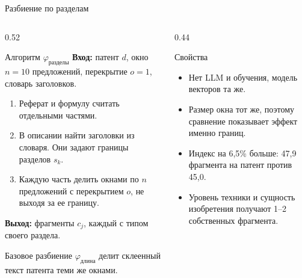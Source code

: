 \documentclass[aspectratio=169]{beamer}
\begin{document}
\begin{frame}{Разбиение по разделам}
    \footnotesize
    \begin{columns}[T]
        \begin{column}{0.52\textwidth}
            \begin{block}{Алгоритм $\varphi_{\text{разделы}}$}
                \textbf{Вход:} патент $d$, окно $n=10$ предложений, перекрытие $o=1$, словарь заголовков.
                \begin{enumerate}[1)]
                    \item Реферат и формулу считать отдельными частями.
                    \item В описании найти заголовки из словаря. Они задают границы разделов $s_k$.
                    \item Каждую часть делить окнами по $n$ предложений с перекрытием $o$, не выходя за ее границу.
                \end{enumerate}
                \textbf{Выход:} фрагменты $c_j$, каждый с типом своего раздела.
            \end{block}
            {\color{soft}Базовое разбиение $\varphi_{\text{длина}}$ делит склеенный текст патента теми же окнами.}
        \end{column}
        \begin{column}{0.44\textwidth}
            \begin{exampleblock}{Свойства}
                \begin{itemize}
                    \item Нет LLM и обучения, модель векторов та же.
                    \item Размер окна тот же, поэтому сравнение показывает эффект именно границ.
                    \item Индекс на 6,5\% больше: 47,9 фрагмента на патент против 45,0.
                    \item Уровень техники и сущность изобретения получают 1--2 собственных фрагмента.
                \end{itemize}
            \end{exampleblock}
        \end{column}
    \end{columns}
\end{frame}
\end{document}
